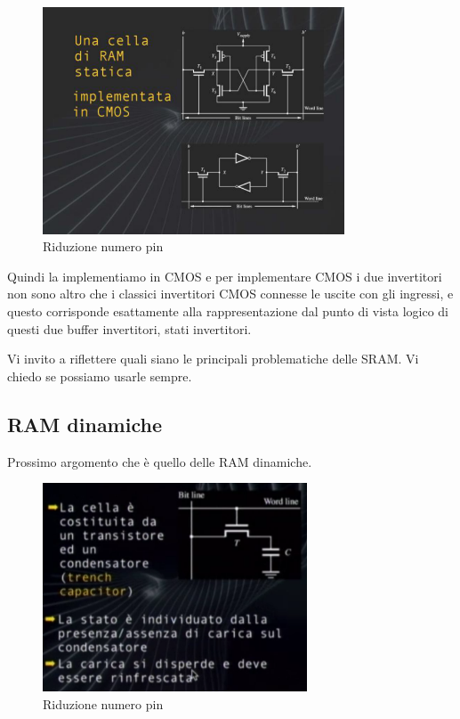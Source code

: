 \FloatBarrier
\begin{figure}[H]
  \centering
  \includegraphics[width=0.80\textwidth,
                    trim=40 40 10 40, %
                    clip]
                    {images/Lez04_p03_fig_04.png}
  \caption{Riduzione numero pin}
  \label{fig:Lez04_p02_fig_04}
\end{figure}
\FloatBarrier
\noindent

Quindi la implementiamo in CMOS e per implementare CMOS i due invertitori non sono altro che i classici invertitori CMOS connesse le uscite con gli ingressi, e questo corrisponde esattamente alla rappresentazione dal punto di vista logico di questi due buffer invertitori, stati invertitori.

Vi invito a riflettere quali siano le principali problematiche delle SRAM.
Vi chiedo se possiamo usarle sempre.

\subsection{RAM dinamiche}

Prossimo argomento che è quello delle RAM dinamiche.

\FloatBarrier
\begin{figure}[H]
  \centering
  \includegraphics[width=0.70\textwidth,
                    trim=0 0 0 0, %
                    clip]
                    {images/Lez04_p03_fig_06a.png}
  \caption{Riduzione numero pin}
  \label{fig:Lez04_p03_fig_06a}
\end{figure}
\FloatBarrier
\noindent

